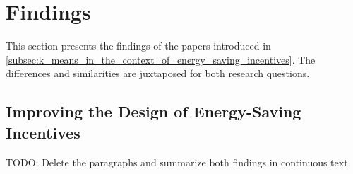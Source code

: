 \chapter{Findings}
\label{cha:findings}


This section presents the findings of the papers introduced in \autoref{subsec:k_means_in_the_context_of_energy_saving_incentives}.
The differences and similarities are juxtaposed for both research questions.

\section{Improving the Design of Energy-Saving Incentives}
\label{sec:improving_the_design_of_energy_saving_incentives}

TODO: Delete the paragraphs and summarize both findings in continuous text
